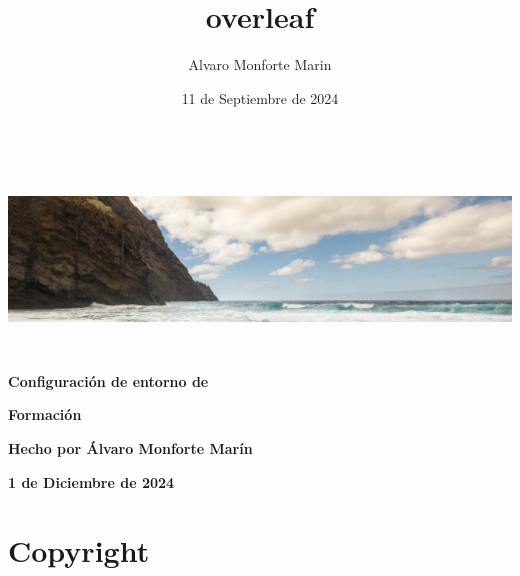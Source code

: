 \documentclass{book}[12pt, a4paper, twoside] %
\title{overleaf}
\author{Alvaro Monforte Marin}
\date{11 de Septiembre de 2024}
\begin{document}
\begin{titlepage}
    \centering
    \includegraphics[height=5cm, keepaspectratio]{./imagenes/encabezado.jpg}\par\vspace{1cm}
    {\LARGE \textbf{Configuración de entorno de} \par}\par\vspace{1cm}
    {\Huge \textbf{Formación}}\par\vspace{1cm}
    \vspace{13cm}
    \begin{tcolorbox}[colback=blue!5!white,colframe=blue!75!black]
        \centering
        {\large \textbf{Hecho por Álvaro Monforte Marín} \par}
        \vfill
    \end{tcolorbox}
    {\normalsize \textbf{1 de Diciembre de 2024} \par}
\end{titlepage}

\let\cleardoublepage\clearpage %

\setcounter{page}{1}
\pagestyle{plain}

{}
\chapter*{Copyright}

\end{document}
